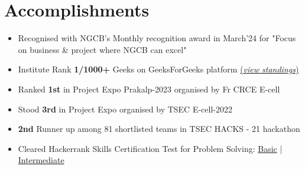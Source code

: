 \documentclass[a4,10pt]{article}
\newenvironment{zitemize}{
\begin{itemize}\itemsep0pt \parskip0pt \parsep1pt}
{\end{itemize}\vspace{-0.5cm}}
\begin{document}
\section{Accomplishments}
\begin{zitemize}
    \item Recognised with NGCB's Monthly recognition award in March'24 for "Focus on business \& project where NGCB can excel"
    \item  Institute Rank \textbf{1/1000+} Geeks on GeeksForGeeks platform \href{https://auth.geeksforgeeks.org/college/thadomal-shahani-engineering-college-tsec-mumbai/}{(\textit{view standings})}
    \item Ranked \textbf{1st} in Project Expo Prakalp-2023 organised by Fr CRCE E-cell
    \item Stood \textbf{3rd} in Project Expo organised by TSEC E-cell-2022
    \item \textbf{2nd} Runner up among 81 shortlisted teams in TSEC HACKS - 21 hackathon 
    \item Cleared Hackerrank Skills Certification Test for Problem Solving:         
        \href{https://www.hackerrank.com/certificates/69fa323a6b13}{Basic} |
        \href{https://www.hackerrank.com/certificates/7be43b2d0925}{Intermediate} 
    
    
    \end{zitemize}

\end{document}
